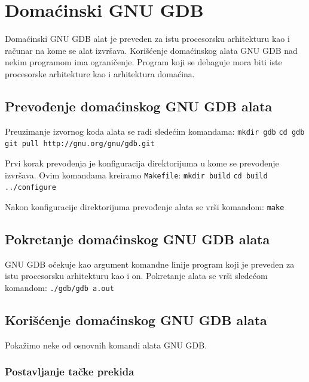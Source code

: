 \documentclass[12pt,oneside]{memoir}
\begin{document}
\section{Domaćinski GNU GDB}

Domaćinski GNU GDB alat je preveden za istu procesorsku arhitekturu kao i računar na kome se alat izvršava. Korišćenje domaćinskog alata GNU GDB nad nekim programom ima ograničenje. Program koji se debaguje mora biti iste procesorske arhitekture kao i arhitektura domaćina.

\subsection{Prevođenje domaćinskog GNU GDB alata}

Preuzimanje izvornog koda alata se radi sledećim komandama:
\newline
\texttt{mkdir gdb}
\newline
\texttt{cd gdb}
\newline
\texttt{git pull http://gnu.org/gnu/gdb.git}

Prvi korak prevođenja je konfiguracija direktorijuma u kome se prevođenje izvršava. Ovim komandama kreiramo \texttt{Makefile}:
\newline
\texttt{mkdir build}
\newline
\texttt{cd build}
\newline
\texttt{../configure}

Nakon konfiguracije direktorijuma prevođenje alata se vrši komandom:
\newline
\texttt{make}

\subsection{Pokretanje domaćinskog GNU GDB alata}

GNU GDB očekuje kao argument komandne linije program koji je preveden za istu procesorsku arhitekturu kao i on. Pokretanje alata se vrši sledećom komandom:
\newline
\texttt{./gdb/gdb a.out}

\subsection{Korišćenje domaćinskog GNU GDB alata}

Pokažimo neke od osnovnih komandi alata GNU GDB.

\subsubsection{Postavljanje tačke prekida}
\end{document}
